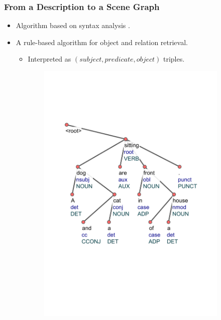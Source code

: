 \documentclass{beamer}
\begin{document}
\begin{frame}
    \frametitle{From a Description to a Scene Graph}
    \begin{itemize}
        \item Algorithm based on syntax analysis \citep{schuster2015generating}.
        \item A rule-based algorithm for object and relation retrieval.
        \begin{itemize}
            \item Interpreted as $(subject, predicate, object)$ triples.
        \end{itemize}
    \end{itemize}
    \begin{figure}
        \begin{subfigure}{0.45\textwidth}
            \centering
            \includegraphics[width=\textwidth,trim=40 160 40 120,clip]{figures/dog_and_cat_in_front_of_house}

\end{subfigure}
\end{figure}
\end{frame}
\end{document}
